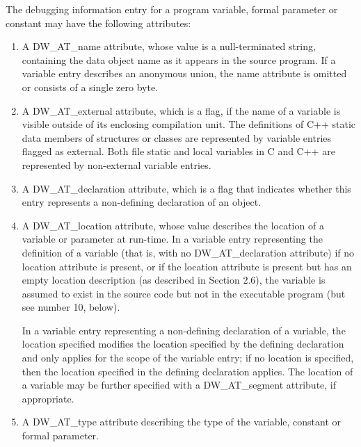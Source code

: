The debugging information entry for a program variable,
formal parameter or constant may have the following attributes:
\begin{enumerate}[1.]
\item A DW\_AT\_name attribute, whose value is a null-terminated
string, containing the data object name as it appears in the
source program.  If a variable entry describes an anonymous
union, the name attribute is omitted or consists of a single
zero byte.

\item A DW\_AT\_external attribute, which is a flag, if the name
of a variable is visible outside of its enclosing compilation
unit.  The definitions of C++ static data members of structures
or classes are represented by variable entries flagged as
external. Both file static and local variables in C and C++
are represented by non-external variable entries.

\item A DW\_AT\_declaration attribute, which is a flag that
indicates whether this entry represents a non-defining
declaration of an object.

\item A DW\_AT\_location attribute, whose value describes the
location of a variable or parameter at run-time.  In a variable
entry representing the definition of a variable (that is,
with no DW\_AT\_declaration attribute) if no location attribute
is present, or if the location attribute is present but has
an empty location description (as described in Section 2.6),
the variable is assumed to exist in the source code but not
in the executable program (but see number 10, below).

In a variable entry representing a non-defining declaration of a variable, the location
specified modifies the location specified by the defining declaration and only applies for the
scope of the variable entry; if no location is specified, then the location specified in the
defining declaration applies.
The location of a variable may be further specified with a DW\_AT\_segment attribute, if
appropriate.

\item A DW\_AT\_type attribute describing the type of the variable,
constant or formal parameter.


\end{enumerate}
